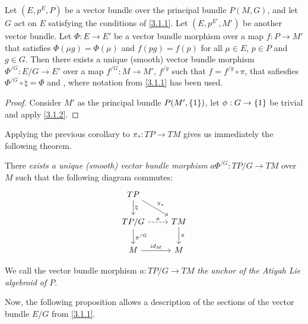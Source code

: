 \begin{corollary}
Let $(E, p^E, P)$ be a vector bundle over the principal bundle $P(M, G)$, and let $G$ act on $E$ satisfying the conditions of \ref{3.1.1}. Let $(E, p^{E'}, M')$ be another vector bundle. Let $\Phi: E \to E'$ be a vector bundle morphism over a map $f: P \to M'$ that satisfies $\Phi(\mu g) = \Phi(\mu)$ and $f(pg) = f(p)$ for all $\mu \in E$, $p \in P$ and $g \in G$. Then there exists a unique (smooth) vector bundle morphism $\Phi^{/G}: E/G \to E'$ over a map $f^{/G}: M \to M'$, $f^{/g}$ such that $f = f^{/g} \circ \pi$, that safiesfies $\Phi^{/G} \circ \natural = \Phi$ and $ $, where notation from \ref{3.1.1} has been used.
\end{corollary}

\begin{proof}
Consider $M'$ as the principal bundle $P(M', \left\{ 1 \right\})$, let $\phi:G \to \set{1}$ be trivial and apply \ref{3.1.2}.
\end{proof}

Applying the previous corollary to $\pi_*: TP \to TM$ gives us immediately the following theorem.

\begin{theorem}\label{anchorAtiyah}
There \emph{exists a unique (smooth) vector bundle morphism} $a  \Phi^{/G}: TP/G \to TM$ over $M$ such that the following diagram commutes:
\begin{equation}
    \begin{tikzcd}
    TP \arrow[]{d}{\natural} \arrow[]{dr}{\pi_*}& \\
    TP/G \arrow[dashed]{r}{a} \arrow[]{d}{\pi^{/G}}& TM \arrow[]{d}{\pi} \\
    M \arrow[]{r}{id_M} & M
    \end{tikzcd}
\end{equation}

We call the vector bundle morphism $a:TP/G \to TM$ \emph{the anchor of the Atiyah Lie algebroid of $P$}.
\end{theorem}

Now, the following proposition allows a description of the sections of the vector bundle $E/G$ from \ref{3.1.1}.

